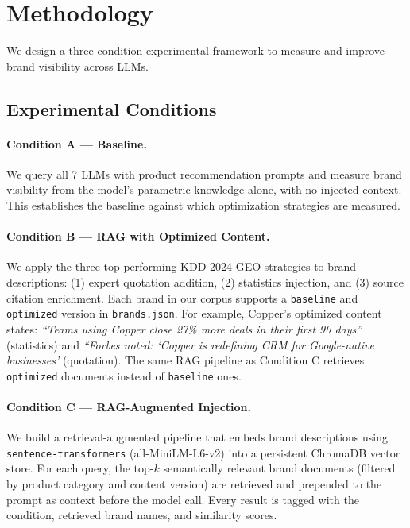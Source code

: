 \documentclass{article}
\begin{document}
\section{Methodology}

We design a three-condition experimental framework to measure and improve brand visibility across LLMs.

\subsection{Experimental Conditions}

\paragraph{Condition A — Baseline.}
We query all 7 LLMs with product recommendation prompts and measure brand visibility from the model's parametric knowledge alone, with no injected context. This establishes the baseline against which optimization strategies are measured.

\paragraph{Condition B — RAG with Optimized Content.}
We apply the three top-performing KDD 2024 GEO strategies to brand descriptions: (1) expert quotation addition, (2) statistics injection, and (3) source citation enrichment. Each brand in our corpus supports a \texttt{baseline} and \texttt{optimized} version in \texttt{brands.json}. For example, Copper's optimized content states: \emph{``Teams using Copper close 27\% more deals in their first 90 days''} (statistics) and \emph{``Forbes noted: `Copper is redefining CRM for Google-native businesses'} (quotation). The same RAG pipeline as Condition C retrieves \texttt{optimized} documents instead of \texttt{baseline} ones.

\paragraph{Condition C — RAG-Augmented Injection.}
We build a retrieval-augmented pipeline that embeds brand descriptions using \texttt{sentence-transformers} (all-MiniLM-L6-v2) into a persistent ChromaDB vector store. For each query, the top-$k$ semantically relevant brand documents (filtered by product category and content version) are retrieved and prepended to the prompt as context before the model call. Every result is tagged with the condition, retrieved brand names, and similarity scores.
\end{document}
